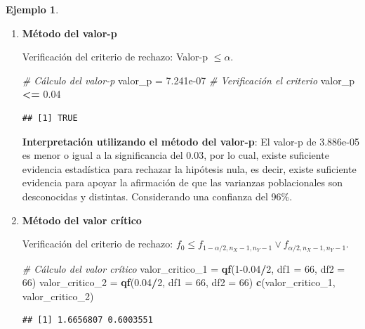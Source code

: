 \documentclass[
  11pt,
]{book}
\newenvironment{Shaded}{\begin{snugshade}}{\end{snugshade}}
\newcommand{\AttributeTok}[1]{\textcolor[rgb]{0.13,0.29,0.53}{#1}}
\newcommand{\CommentTok}[1]{\textcolor[rgb]{0.56,0.35,0.01}{\textit{#1}}}
\newcommand{\DecValTok}[1]{\textcolor[rgb]{0.00,0.00,0.81}{#1}}
\newcommand{\FloatTok}[1]{\textcolor[rgb]{0.00,0.00,0.81}{#1}}
\newcommand{\FunctionTok}[1]{\textcolor[rgb]{0.13,0.29,0.53}{\textbf{#1}}}
\newcommand{\NormalTok}[1]{#1}
\newcommand{\OtherTok}[1]{\textcolor[rgb]{0.56,0.35,0.01}{#1}}
\newcommand{\SpecialCharTok}[1]{\textcolor[rgb]{0.81,0.36,0.00}{\textbf{#1}}}
\theoremstyle{definition}
\theoremstyle{definition}
\newtheorem{example}{Ejemplo}[chapter]
\theoremstyle{definition}
\theoremstyle{definition}
\theoremstyle{remark}
\begin{document}
\begin{example}
\begin{enumerate}
\def\labelenumi{\arabic{enumi}.}
\item
  \textbf{Método del valor-p}

  Verificación del criterio de rechazo: Valor-p \(\leq \alpha\).

\begin{Shaded}
\begin{Highlighting}[]
\CommentTok{\# Cálculo del valor{-}p}
\NormalTok{valor\_p }\OtherTok{=} \FloatTok{7.241e{-}07}
\CommentTok{\# Verificación el criterio}
\NormalTok{valor\_p }\SpecialCharTok{\textless{}=} \FloatTok{0.04}
\end{Highlighting}
\end{Shaded}

\begin{verbatim}
## [1] TRUE
\end{verbatim}

  \textbf{Interpretación utilizando el método del valor-p}: El valor-p de 3.886e-05 es menor o igual a la significancia del 0.03, por lo cual, existe suficiente evidencia estadística para rechazar la hipótesis nula, es decir, existe suficiente evidencia para apoyar la afirmación de que las varianzas poblacionales son desconocidas y distintas. Considerando una confianza del 96\%.
\item
  \textbf{Método del valor crítico}

  Verificación del criterio de rechazo: \(f_0 \leq f_{1-\alpha/2,n_X-1,n_Y-1} \vee f_{\alpha/2,n_X-1,n_Y-1}\).

\begin{Shaded}
\begin{Highlighting}[]
\CommentTok{\# Cálculo del valor crítico}
\NormalTok{valor\_critico\_1 }\OtherTok{=} \FunctionTok{qf}\NormalTok{(}\DecValTok{1}\FloatTok{{-}0.04}\SpecialCharTok{/}\DecValTok{2}\NormalTok{, }\AttributeTok{df1 =} \DecValTok{66}\NormalTok{, }\AttributeTok{df2 =} \DecValTok{66}\NormalTok{)}
\NormalTok{valor\_critico\_2 }\OtherTok{=} \FunctionTok{qf}\NormalTok{(}\FloatTok{0.04}\SpecialCharTok{/}\DecValTok{2}\NormalTok{, }\AttributeTok{df1 =} \DecValTok{66}\NormalTok{, }\AttributeTok{df2 =} \DecValTok{66}\NormalTok{)}
\FunctionTok{c}\NormalTok{(valor\_critico\_1, valor\_critico\_2)}
\end{Highlighting}
\end{Shaded}

\begin{verbatim}
## [1] 1.6656807 0.6003551
\end{verbatim}


\end{enumerate}
\end{example}
\end{document}
